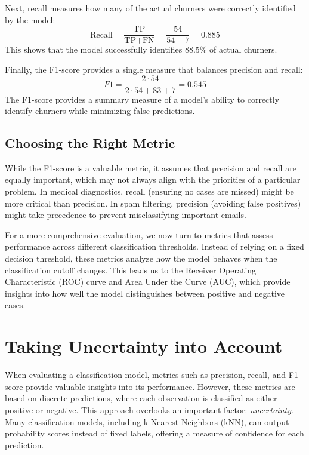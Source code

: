 \documentclass[
  11pt,
]{book}
\theoremstyle{definition}
\theoremstyle{definition}
\theoremstyle{definition}
\theoremstyle{definition}
\theoremstyle{remark}
\begin{document}
Next, recall measures how many of the actual churners were correctly identified by the model:
\[
\text{Recall} = \frac{\text{TP}}{\text{TP} + \text{FN}} = \frac{54}{54 + 7} = 0.885
\]
This shows that the model successfully identifies 88.5\% of actual churners.

Finally, the F1-score provides a single measure that balances precision and recall:
\[
F1 = \frac{2 \cdot 54}{2 \cdot 54 + 83 + 7} = 0.545
\]
The F1-score provides a summary measure of a model's ability to correctly identify churners while minimizing false predictions.

\subsection*{Choosing the Right Metric}\label{choosing-the-right-metric}


While the F1-score is a valuable metric, it assumes that precision and recall are equally important, which may not always align with the priorities of a particular problem. In medical diagnostics, recall (ensuring no cases are missed) might be more critical than precision. In spam filtering, precision (avoiding false positives) might take precedence to prevent misclassifying important emails.

For a more comprehensive evaluation, we now turn to metrics that assess performance across different classification thresholds. Instead of relying on a fixed decision threshold, these metrics analyze how the model behaves when the classification cutoff changes. This leads us to the Receiver Operating Characteristic (ROC) curve and Area Under the Curve (AUC), which provide insights into how well the model distinguishes between positive and negative cases.

\section{Taking Uncertainty into Account}\label{taking-uncertainty-into-account}

When evaluating a classification model, metrics such as precision, recall, and F1-score provide valuable insights into its performance. However, these metrics are based on discrete predictions, where each observation is classified as either positive or negative. This approach overlooks an important factor: \emph{uncertainty}. Many classification models, including k-Nearest Neighbors (kNN), can output probability scores instead of fixed labels, offering a measure of confidence for each prediction.
\end{document}
